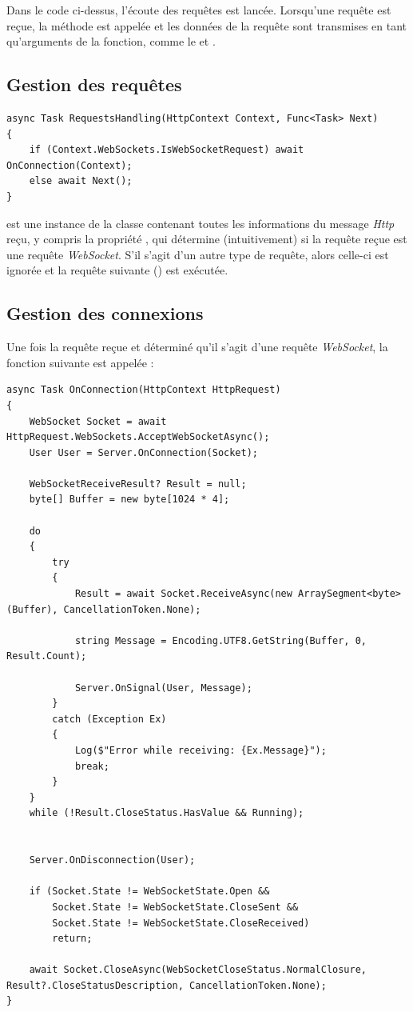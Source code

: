 \documentclass[12pt]{report}
\begin{document}
Dans le code ci-dessus, l'écoute des requêtes est lancée. Lorsqu'une requête est reçue, la méthode  est appelée et les données de la requête sont transmises en tant qu'arguments de la fonction, comme le  et .

\subsection{Gestion des requêtes}
\begin{verbatim}
async Task RequestsHandling(HttpContext Context, Func<Task> Next)
{
    if (Context.WebSockets.IsWebSocketRequest) await OnConnection(Context);
    else await Next();
}
\end{verbatim}

 est une instance de la classe  contenant toutes les informations du message \textit{Http} reçu, y compris la propriété , qui détermine (intuitivement) si la requête reçue est une requête \textit{WebSocket}. S'il s'agit d'un autre type de requête, alors celle-ci est ignorée et la requête suivante () est exécutée.

\subsection{Gestion des connexions}

Une fois la requête reçue et déterminé qu’il s’agit d’une requête \textit{WebSocket}, la fonction  suivante est appelée :

\begin{verbatim}
async Task OnConnection(HttpContext HttpRequest)
{
    WebSocket Socket = await HttpRequest.WebSockets.AcceptWebSocketAsync();
    User User = Server.OnConnection(Socket);

    WebSocketReceiveResult? Result = null;
    byte[] Buffer = new byte[1024 * 4];

    do
    {
        try
        {
            Result = await Socket.ReceiveAsync(new ArraySegment<byte>(Buffer), CancellationToken.None);

            string Message = Encoding.UTF8.GetString(Buffer, 0, Result.Count);

            Server.OnSignal(User, Message);
        }
        catch (Exception Ex)
        {
            Log($"Error while receiving: {Ex.Message}");
            break;
        }
    }
    while (!Result.CloseStatus.HasValue && Running);


    Server.OnDisconnection(User);

    if (Socket.State != WebSocketState.Open &&
        Socket.State != WebSocketState.CloseSent &&
        Socket.State != WebSocketState.CloseReceived)
        return;

    await Socket.CloseAsync(WebSocketCloseStatus.NormalClosure, Result?.CloseStatusDescription, CancellationToken.None);
}
\end{verbatim}
\end{document}
